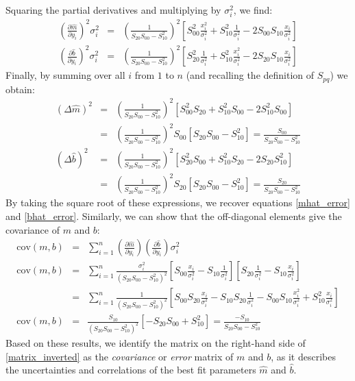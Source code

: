 \documentclass{article}
\begin{document}
Squaring the partial derivatives and multiplying by $\sigma_i^2$, we find:
\begin{eqnarray}
  \left(\frac{\partial \hat{m}}{\partial y_i}\right)^2\sigma_i^2 &=& \left(\frac{1}{S_{20}S_{00} - S_{10}^2}\right)^2 \left[S_{00}^2 \frac{x_i^2}{\sigma_i^2} + S_{10}^2\frac{1}{\sigma_i^2} - 2S_{00}S_{10} \frac{x_i}{\sigma_i^2} \right] \\
  \left(\frac{\partial \hat{b}}{\partial y_i}\right)^2\sigma_i^2 &=& \left(\frac{1}{S_{20}S_{00} - S_{10}^2}\right)^2 \left[S_{20}^2 \frac{1}{\sigma_i^2} + S_{10}^2\frac{x_i^2}{\sigma_i^2} - 2S_{20}S_{10} \frac{x_i}{\sigma_i^2} \right]
\end{eqnarray}
Finally, by summing over all $i$ from $1$ to $n$ (and recalling the definition of $S_{pq}$) we obtain:
\begin{eqnarray}
  \left(\Delta \hat{m} \right)^2 &=& \left(\frac{1}{S_{20}S_{00} - S_{10}^2}\right)^2 \left[S_{00}^2 S_{20} + S_{10}^2 S_{00} - 2S_{10}^2 S_{00} \right] \\
  &=& \left(\frac{1}{S_{20}S_{00} - S_{10}^2}\right)^2 S_{00}\left[S_{20}S_{00} - S_{10}^2 \right] = \frac{S_{00}}{S_{20}S_{00} - S_{10}^2} \\
  \left(\Delta \hat{b} \right)^2 &=& \left(\frac{1}{S_{20}S_{00} - S_{10}^2}\right)^2 \left[S_{20}^2 S_{00} + S_{10}^2 S_{20} - 2S_{20}S_{10}^2 \right] \\
  &=& \left(\frac{1}{S_{20}S_{00} - S_{10}^2}\right)^2 S_{20}\left[S_{20}S_{00} - S_{10}^2 \right] = \frac{S_{20}}{S_{20}S_{00} - S_{10}^2} 
\end{eqnarray}
By taking the square root of these expressions, we recover equations \eqref{mhat_error} and \eqref{bhat_error}. Similarly, we can show that the off-diagonal elements give the covariance of $m$ and $b$:
\begin{eqnarray}
  \mbox{cov}(m,b) &=& \sum_{i=1}^{n} \left(\frac{\partial \hat{m}}{\partial y_i}\right)\left(\frac{\partial \hat{b}}{\partial y_i}\right) \sigma_i^2 \\
  \mbox{cov}(m,b) &=& \sum_{i=1}^{n} \frac{\sigma_i^2}{(S_{20}S_{00} - S_{10}^2)^2}\left[S_{00}\frac{x_i}{\sigma_i^2} - S_{10}\frac{1}{\sigma_i^2}\right]\left[S_{20}\frac{1}{\sigma_i^2} - S_{10}\frac{x_i}{\sigma_i^2}\right] \\
  &=& \sum_{i=1}^{n}\frac{1}{(S_{20}S_{00} - S_{10}^2)^2} \left[S_{00}S_{20}\frac{x_i}{\sigma_i^2} - S_{10}S_{20}\frac{1}{\sigma_i^2} - S_{00}S_{10}\frac{x_i^2}{\sigma_i^2} + S_{10}^2 \frac{x_i}{\sigma_i^2}\right] \\
  \mbox{cov}(m,b) &=& \frac{S_{10}}{(S_{20}S_{00} - S_{10}^2)^2} \left[-S_{20}S_{00} + S_{10}^2\right] = \frac{-S_{10}}{S_{20}S_{00}-S_{10}^2}
\end{eqnarray}
Based on these results, we identify the matrix on the right-hand side of \eqref{matrix_inverted} as the \emph{covariance} or \emph{error} matrix of $m$ and $b$, as it describes the uncertainties and correlations of the best fit parameters $\hat{m}$ and $\hat{b}$.
\end{document}
